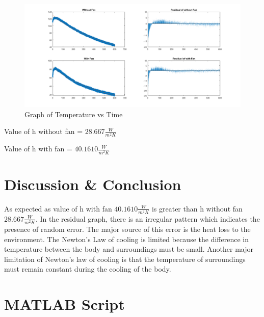 \newpage
\begin{figure}[h!]
    \centering
    \includegraphics[width=\textwidth]{figures/Subplots.png}
    \caption{Graph of Temperature vs Time}
    \label{fig:yx}
\end{figure}
\begin{center}
    Value of h without fan = $ 28.667 \frac{W}{m^2K} $
\end{center}
\begin{center}
    Value of h with fan = $ 40.1610 \frac{W}{m^2K} $
\end{center}
\section{Discussion \& Conclusion}

As expected as value of h with fan  $ 40.1610 \frac{W}{m^2K} $ is greater than h without fan $ 28.667 \frac{W}{m^2K} $. In the residual graph, there is an irregular pattern which indicates the presence of random error. The major source of this error is the heat loss to the environment. The Newton's Law of cooling is limited because the difference in temperature between the body and surroundings must be small. Another major limitation of Newton’s law of cooling is that the temperature of surroundings must remain constant during the cooling of the body.


\section{MATLAB Script}




